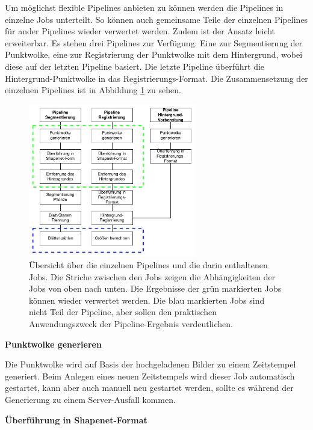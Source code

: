 \documentclass[12pt,titlepage, twoside]{article}
\begin{document}
Um möglichst flexible Pipelines anbieten zu können werden die Pipelines in einzelne Jobs unterteilt. So können auch gemeinsame Teile der einzelnen Pipelines für ander Pipelines wieder verwertet werden.
Zudem ist der Ansatz leicht erweiterbar. 
Es stehen drei Pipelines zur Verfügung: Eine zur Segmentierung der Punktwolke, eine zur Registrierung der Punktwolke mit dem Hintergrund, wobei diese auf der letzten Pipeline basiert.
Die letzte Pipeline überführt die Hintergrund-Punktwolke in das Registrierungs-Format.
Die Zusammensetzung der einzelnen Pipelines ist in Abbildung \ref{fig:Pipelines} zu sehen.

\begin{figure}
    \centering
    \includegraphics[width=0.65\textwidth]{./Images/Pipelines.png}
    \caption{Übersicht über die einzelnen Pipelines und die darin enthaltenen Jobs. Die Striche zwischen den Jobs zeigen die Abhängigkeiten der Jobs von oben nach unten.
    Die Ergebnisse der grün markierten Jobs können wieder verwertet werden. 
    Die blau markierten Jobs sind nicht Teil der Pipeline, aber sollen den praktischen Anwendungszweck der Pipeline-Ergebnis verdeutlichen.}
    \label{fig:Pipelines}
\end{figure}

\textbf{Punktwolke generieren}

Die Punktwolke wird auf Basis der hochgeladenen Bilder zu einem Zeitstempel generiert. 
Beim Anlegen eines neuen Zeitstempels wird dieser Job automatisch gestartet, kann aber auch manuell neu gestartet werden, sollte es während der Generierung zu einem Server-Ausfall kommen.

\textbf{Überführung in Shapenet-Format}
\end{document}
